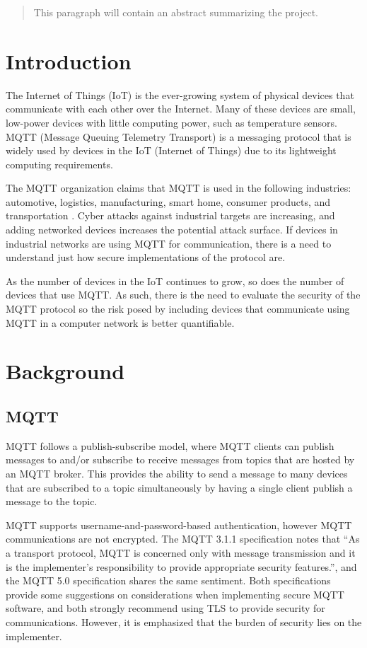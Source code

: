 \documentclass[12pt]{article}
\begin{document}

\begin{abstract}
	This paragraph will contain an abstract summarizing the project.
\end{abstract}

\tableofcontents
\listoffigures
\section{Introduction}
The Internet of Things (IoT) is the ever-growing system of physical devices that communicate with each other over the Internet.  Many of these devices are small, low-power devices with little computing power, such as temperature sensors. MQTT (Message Queuing Telemetry Transport) is a messaging protocol that is widely used by devices in the IoT (Internet of Things) due to its lightweight computing requirements. \par

The MQTT organization claims that MQTT is used in the following industries: automotive, logistics, manufacturing, smart home, consumer products, and transportation \cite{mqtt-org}. Cyber attacks against industrial targets are increasing, and adding networked devices increases the potential attack surface. If devices in industrial networks are using MQTT for communication, there is a need to understand just how secure implementations of the protocol are.\par
As the number of devices in the IoT continues to grow, so does the number of devices that use MQTT. As such, there is the need to evaluate the security of the MQTT protocol so the risk posed by including devices that communicate using MQTT in a computer network is better quantifiable.
\section{Background}
\subsection{MQTT}
MQTT follows a publish-subscribe model, where MQTT clients can publish messages to and/or subscribe to receive messages from topics that are hosted by an MQTT broker. This provides the ability to send a message to many devices that are subscribed to a topic simultaneously by having a single client publish a message to the topic. \par
MQTT supports username-and-password-based authentication, however MQTT communications are not encrypted. The MQTT 3.1.1 specification notes that ``As a transport protocol, MQTT is concerned only with message transmission and it is the implementer’s responsibility to provide appropriate security features.''\cite{mqtt3.1.1}, and the MQTT 5.0 specification shares the same sentiment\cite{mqtt5.0}. Both specifications provide some suggestions on considerations when implementing secure MQTT software, and both strongly recommend using TLS to provide security for communications. However, it is emphasized that the burden of security lies on the implementer. 
\end{document}
